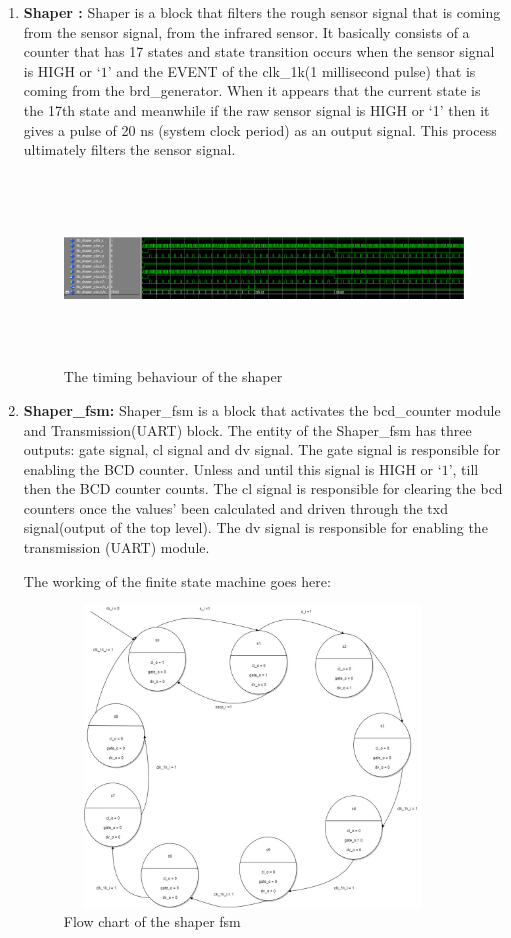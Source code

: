 \documentclass[12pt,a4paper]{article}
\begin{document}
\begin{enumerate}
\item \textbf{Shaper :} Shaper is a block that filters the rough sensor signal that is coming from the sensor signal, from the infrared sensor. It basically consists of a counter that has 17 states and state transition occurs when the sensor signal is HIGH or ‘$1$’ and the EVENT of the clk\_1k(1 millisecond pulse) that is coming from the brd\_generator. When it appears that the current state is the 17th state and meanwhile if the raw sensor signal is HIGH or ‘1’ then it gives a pulse of 20 ns (system clock period) as an output signal. This process ultimately filters the sensor signal.

\begin{figure}[H]
\centering
\includegraphics[width=15cm,height=5cm ]{shaper.PNG}
\caption{The timing behaviour of the shaper}
\label{the timing behaviour of the shaper}
\end{figure}

\item \textbf{Shaper\_fsm:} Shaper\_fsm is a block that activates the bcd\_counter module and Transmission(UART) block. The entity of the Shaper\_fsm has three outputs: gate signal, cl signal and dv signal. The gate signal is responsible for enabling the BCD counter. Unless and until this signal is HIGH or ‘$1$’, till then the BCD counter counts. The cl signal is responsible for clearing the bcd counters once the values’ been calculated and driven through the txd signal(output of the top level). The dv signal is responsible for enabling the transmission (UART) module.\


The working of the finite state machine goes here:\

\begin{figure}[H]
\centering
\includegraphics[width=10cm,height=8cm]{shaper_fsm.jpg}
\caption{Flow chart of the shaper fsm}
\label{Flow chart of the shaper fsm}
\end{figure}


\end{enumerate}
\end{document}
